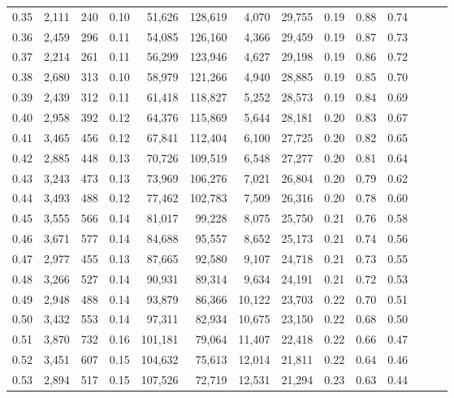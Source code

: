 \begin{tabular}{rrrrrrrrrrrrrr}
0.35 &  2,111 &  240 &  0.10 &   51,626 &  128,619 &   4,070 &  29,755 &  0.19 &  0.88 &      0.74 \\
0.36 &  2,459 &  296 &  0.11 &   54,085 &  126,160 &   4,366 &  29,459 &  0.19 &  0.87 &      0.73 \\
0.37 &  2,214 &  261 &  0.11 &   56,299 &  123,946 &   4,627 &  29,198 &  0.19 &  0.86 &      0.72 \\
0.38 &  2,680 &  313 &  0.10 &   58,979 &  121,266 &   4,940 &  28,885 &  0.19 &  0.85 &      0.70 \\
0.39 &  2,439 &  312 &  0.11 &   61,418 &  118,827 &   5,252 &  28,573 &  0.19 &  0.84 &      0.69 \\
0.40 &  2,958 &  392 &  0.12 &   64,376 &  115,869 &   5,644 &  28,181 &  0.20 &  0.83 &      0.67 \\
0.41 &  3,465 &  456 &  0.12 &   67,841 &  112,404 &   6,100 &  27,725 &  0.20 &  0.82 &      0.65 \\
0.42 &  2,885 &  448 &  0.13 &   70,726 &  109,519 &   6,548 &  27,277 &  0.20 &  0.81 &      0.64 \\
0.43 &  3,243 &  473 &  0.13 &   73,969 &  106,276 &   7,021 &  26,804 &  0.20 &  0.79 &      0.62 \\
0.44 &  3,493 &  488 &  0.12 &   77,462 &  102,783 &   7,509 &  26,316 &  0.20 &  0.78 &      0.60 \\
0.45 &  3,555 &  566 &  0.14 &   81,017 &   99,228 &   8,075 &  25,750 &  0.21 &  0.76 &      0.58 \\
0.46 &  3,671 &  577 &  0.14 &   84,688 &   95,557 &   8,652 &  25,173 &  0.21 &  0.74 &      0.56 \\
0.47 &  2,977 &  455 &  0.13 &   87,665 &   92,580 &   9,107 &  24,718 &  0.21 &  0.73 &      0.55 \\
0.48 &  3,266 &  527 &  0.14 &   90,931 &   89,314 &   9,634 &  24,191 &  0.21 &  0.72 &      0.53 \\
0.49 &  2,948 &  488 &  0.14 &   93,879 &   86,366 &  10,122 &  23,703 &  0.22 &  0.70 &      0.51 \\
0.50 &  3,432 &  553 &  0.14 &   97,311 &   82,934 &  10,675 &  23,150 &  0.22 &  0.68 &      0.50 \\
0.51 &  3,870 &  732 &  0.16 &  101,181 &   79,064 &  11,407 &  22,418 &  0.22 &  0.66 &      0.47 \\
0.52 &  3,451 &  607 &  0.15 &  104,632 &   75,613 &  12,014 &  21,811 &  0.22 &  0.64 &      0.46 \\
0.53 &  2,894 &  517 &  0.15 &  107,526 &   72,719 &  12,531 &  21,294 &  0.23 &  0.63 &      0.44 \\

\end{tabular}
